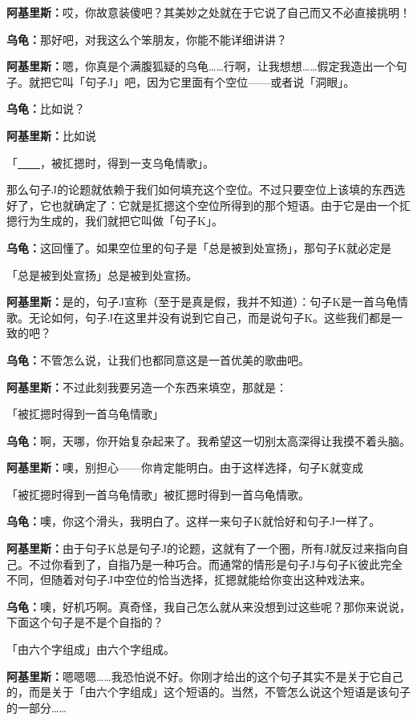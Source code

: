 \documentclass[
  12pt,
  twoside,
  openright,
  oldfontcommands,
]{memoir}
\newcommand{\dialogname}[1]{{\heifamily\bfseries #1}}
\begin{document}
\dialogname{阿基里斯：}哎，你故意装傻吧？其美妙之处就在于它说了自己而又不必直接挑明！

\dialogname{乌龟：}那好吧，对我这么个笨朋友，你能不能详细讲讲？

\dialogname{阿基里斯：}嗯，你真是个满腹狐疑的乌龟\ldots\ldots 行啊，让我想想\ldots\ldots 假定我造出一个句子。就把它叫「句子J」吧，因为它里面有个空位------或者说「洞眼」。

\dialogname{乌龟：}比如说？

\dialogname{阿基里斯：}比如说

「\underline{　　}，被㧟摁时，得到一支乌龟情歌」。

那么句子J的论题就依赖于我们如何填充这个空位。不过只要空位上该填的东西选好了，它也就确定了：它就是㧟摁这个空位所得到的那个短语。由于它是由一个㧟摁行为生成的，我们就把它叫做「句子K」。

\dialogname{乌龟：}这回懂了。如果空位里的句子是「总是被到处宣扬」，那句子K就必定是

「总是被到处宣扬」总是被到处宣扬。

\dialogname{阿基里斯：}是的，句子J宣称（至于是真是假，我并不知道）：句子K是一首乌龟情歌。无论如何，句子J在这里并没有说到它自己，而是说句子K。这些我们都是一致的吧？

\dialogname{乌龟：}不管怎么说，让我们也都同意这是一首优美的歌曲吧。

\dialogname{阿基里斯：}不过此刻我要另造一个东西来填空，那就是：

「被㧟摁时得到一首乌龟情歌」

\dialogname{乌龟：}啊，天哪，你开始复杂起来了。我希望这一切别太高深得让我摸不着头脑。

\dialogname{阿基里斯：}噢，别担心------你肯定能明白。由于这样选择，句子K就变成

「被㧟摁时得到一首乌龟情歌」被㧟摁时得到一首乌龟情歌。

\dialogname{乌龟：}噢，你这个滑头，我明白了。这样一来句子K就恰好和句子J一样了。

\dialogname{阿基里斯：}由于句子K总是句子J的论题，这就有了一个圈，所有J就反过来指向自己。不过你看到了，自指乃是一种巧合。而通常的情形是句子J与句子K彼此完全不同，但随着对句子J中空位的恰当选择，㧟摁就能给你变出这种戏法来。

\dialogname{乌龟：}噢，好机巧啊。真奇怪，我自己怎么就从来没想到过这些呢？那你来说说，下面这个句子是不是个自指的？

「由六个字组成」由六个字组成。

\dialogname{阿基里斯：}嗯嗯嗯\ldots\ldots 我恐怕说不好。你刚才给出的这个句子其实不是关于它自己的，而是关于「由六个字组成」这个短语的。当然，不管怎么说这个短语是该句子的一部分\ldots\ldots{}
\end{document}

